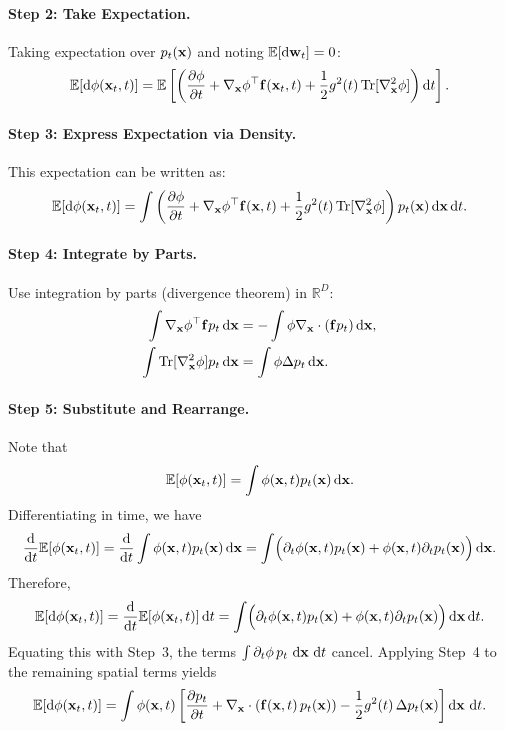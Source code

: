 \paragraph{Step 2: Take Expectation.}
Taking expectation over $p_t({\mathbf{x}})$ and noting $\mathbb{E}[\mathop{}\!\mathrm{d} {\mathbf{w}}_t] = 0$:
\[
\mathbb{E}[\mathop{}\!\mathrm{d} \phi({\mathbf{x}}_t, t)] = \mathbb{E} \left[ \left( \frac{\partial \phi}{\partial t} + \nabla_{{\mathbf{x}}} \phi^\top {\mathbf{f}}({\mathbf{x}}_t, t) + \frac{1}{2} g^2(t) \operatorname{Tr}[\nabla_{{\mathbf{x}}}^2 \phi] \right) \mathop{}\!\mathrm{d} t \right].
\]
\paragraph{Step 3: Express Expectation via Density.}
This expectation can be written as:
\[
\mathbb{E}[\mathop{}\!\mathrm{d} \phi({\mathbf{x}}_t, t)] = \int \left( \frac{\partial \phi}{\partial t} + \nabla_{{\mathbf{x}}} \phi^\top {\mathbf{f}}({\mathbf{x}}, t) + \frac{1}{2} g^2(t) \operatorname{Tr}[\nabla_{{\mathbf{x}}}^2 \phi] \right) p_t({\mathbf{x}}) \mathop{}\!\mathrm{d} {\mathbf{x}} \mathop{}\!\mathrm{d} t.
\]
\paragraph{Step 4: Integrate by Parts.}
Use integration by parts (divergence theorem) in $\mathbb{R}^D$:
\begin{align*}
    \int \nabla_{{\mathbf{x}}} \phi^\top {\mathbf{f}} p_t \mathop{}\!\mathrm{d} {\mathbf{x}} &= -\int \phi \nabla_{{\mathbf{x}}} \cdot ({\mathbf{f}} p_t) \mathop{}\!\mathrm{d} {\mathbf{x}}, \\
    \int \operatorname{Tr}[\nabla_{{\mathbf{x}}}^2 \phi] p_t  \mathop{}\!\mathrm{d} {\mathbf{x}} &= \int \phi \Delta p_t \mathop{}\!\mathrm{d} {\mathbf{x}}.
\end{align*}
\paragraph{Step 5: Substitute and Rearrange.}
Note that
\[
\mathbb{E}[\phi({\mathbf{x}}_t,t)] = \int \phi({\mathbf{x}},t) p_t({\mathbf{x}}) \mathop{}\!\mathrm{d}{\mathbf{x}}.
\]
Differentiating in time, we have
\[
\frac{\mathop{}\!\mathrm{d}}{\mathop{}\!\mathrm{d} t}\mathbb{E}[\phi({\mathbf{x}}_t,t)]
= \frac{\mathop{}\!\mathrm{d}}{\mathop{}\!\mathrm{d} t}\int \phi({\mathbf{x}},t) p_t({\mathbf{x}}) \mathop{}\!\mathrm{d}{\mathbf{x}}
= \int\Bigl(\partial_t\phi({\mathbf{x}},t) p_t({\mathbf{x}}) + \phi({\mathbf{x}},t) \partial_t p_t({\mathbf{x}})\Bigr)\mathop{}\!\mathrm{d}{\mathbf{x}}.
\]
Therefore,
\[
\mathbb{E}[\mathop{}\!\mathrm{d} \phi({\mathbf{x}}_t,t)]
= \frac{\mathop{}\!\mathrm{d}}{\mathop{}\!\mathrm{d} t}\mathbb{E}[\phi({\mathbf{x}}_t,t)] \mathop{}\!\mathrm{d} t
= \int\Bigl(\partial_t\phi({\mathbf{x}},t) p_t({\mathbf{x}}) + \phi({\mathbf{x}},t) \partial_t p_t({\mathbf{x}})\Bigr)\mathop{}\!\mathrm{d}{\mathbf{x}} \mathop{}\!\mathrm{d} t.
\]
Equating this with Step~3, the terms $\int \partial_t\phi\,p_t\,\mathop{}\!\mathrm{d} {\mathbf{x}}\,\mathop{}\!\mathrm{d} t$ cancel. Applying Step~4 to the remaining spatial terms yields
\[
\mathbb{E}[\mathop{}\!\mathrm{d} \phi({\mathbf{x}}_t, t)]
= \int \phi({\mathbf{x}}, t)\left[ \frac{\partial p_t}{\partial t}
+ \nabla_{{\mathbf{x}}}\cdot({\mathbf{f}}({\mathbf{x}},t)\,p_t({\mathbf{x}}))
- \frac{1}{2} g^2(t)\,\Delta p_t({\mathbf{x}}) \right]\mathop{}\!\mathrm{d} {\mathbf{x}}\,\mathop{}\!\mathrm{d} t.
\]

